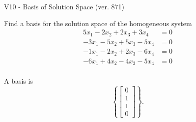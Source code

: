 \begin{exercise}
  \begin{exerciseTitle}V10 - Basis of Solution Space (ver. 871)\end{exerciseTitle}
  \begin{exerciseStatement}
    Find a basis for the solution space of the homogeneous system 
\begin{align*}
 5 x_ 1 -2 x_ 2 + 2 x_ 3 + 3 x_ 4 &= 0  \\ 
  -3 x_ 1 -5 x_ 2 + 5 x_ 3 -5 x_ 4 &= 0  \\ 
  -1 x_ 1 -2 x_ 2 + 2 x_ 3 -6 x_ 4 &= 0  \\ 
  -6 x_ 1 + 4 x_ 2 -4 x_ 3 -5 x_ 4 &= 0  \\ 
 \end{align*}


 
  \end{exerciseStatement}

  \begin{exerciseAnswer}
   A basis is   
\[\left\{\left[\begin{array}{c}
0 \\
1 \\
1 \\
0
\end{array}\right]\right\}.\]

  


  \end{exerciseAnswer}
\end{exercise}